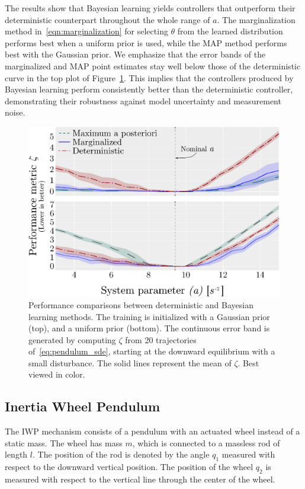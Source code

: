 The results show that Bayesian learning yields controllers that outperform 
their deterministic counterpart throughout the whole range of $a$.
%
The marginalization method in~\eqref{eqn:marginalization} for selecting $\theta$
from the learned distribution performs best when a uniform prior is used, while
the MAP method performs best with the Gaussian prior.
%
We emphasize that the error bands of the marginalized and MAP point
estimates stay well below those of the deterministic curve in the top plot of
Figure~\ref{fig:bayes_compare}.
%
This implies that the controllers produced by Bayesian learning perform
consistently better than the deterministic controller, demonstrating their
robustness against model uncertainty and measurement noise.


\begin{figure}[tb]
    \centering
    \includegraphics[width=0.7\linewidth]{figures/H_combined.eps}
    \caption{
        Performance comparisons between deterministic and Bayesian learning
        methods. 
        The training is initialized with a Gaussian prior (top), and a
        uniform prior (bottom). 
        The continuous error band is generated by computing $\zeta$ from 20
        trajectories of~\eqref{eq:pendulum_sde}, starting at the downward
        equilibrium with a small disturbance. 
        The solid lines represent the mean of $\zeta$. 
        Best viewed in color.
    }
    \label{fig:bayes_compare}
\end{figure}
\subsection{Inertia Wheel Pendulum}
\label{subsec:iwp}

The IWP mechanism consists of a pendulum with an actuated wheel instead of a static
mass.
%
The wheel has mass $m$, which is connected to a massless rod of length \(l\). 
%
The position of the rod is denoted by the angle \(q_1\) measured with
respect to the downward vertical position.
%
The position of the wheel \(q_2\) is measured with respect to the vertical
line through the center of the wheel.

